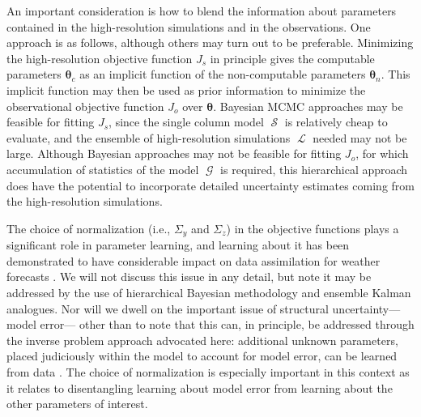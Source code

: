 \documentclass[draft]{agujournal}
\renewcommand{\vec}[1]{\boldsymbol{{#1}}}
\newcommand{\cG}{\mathop{\mathcal{G}}}
\newcommand{\cL}{\mathop{\mathcal{L}}}
\newcommand{\cS}{\mathop{\mathcal{S}}}
\begin{document}
An important consideration is how to blend the information about parameters contained in the high-resolution simulations and in the observations. One approach is as follows, although others may turn out to be preferable. Minimizing the high-resolution objective function $J_s$ in principle gives the computable parameters $\vec{\theta}_c$ as an implicit function of the non-computable parameters $\vec{\theta}_n$. This implicit function may then be used as prior information to minimize  the observational objective function $J_o$ over $\vec{\theta}.$ Bayesian MCMC approaches may be feasible for fitting $J_s$, since the single column model $\cS$ is relatively cheap to evaluate, and the ensemble of high-resolution simulations $\cL$ needed may not be large. Although Bayesian approaches may not be feasible for fitting $J_o$, for which accumulation of statistics of the model $\cG$ is required, this hierarchical approach does have the potential to incorporate detailed uncertainty estimates coming from the high-resolution simulations.

The choice of normalization (i.e., $\Sigma_y$ and $\Sigma_z$) in the objective functions plays a significant role in parameter learning, and learning about it has been demonstrated to have considerable impact on data assimilation for weather forecasts \citep{Dee95a,Stewart14a}. We will not discuss this issue in any detail, but note it may be addressed by the use of hierarchical Bayesian methodology and ensemble Kalman analogues. Nor will we dwell on the important issue of structural uncertainty---model error--- other than to note that this can, in principle, be addressed through the inverse problem approach advocated here: additional unknown parameters, placed judiciously within the model to account for model error, can be learned from data \citep{Kennedy01a,Dee05a}. The choice of normalization is especially important in this context as it relates to disentangling learning about model error from learning about the other parameters of interest.
\end{document}
